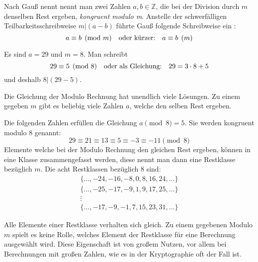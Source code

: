 \newpage
\noindent
Nach Gauß nennt nennt man zwei Zahlen $a, b \in \mathbb{Z}$, die bei der Division durch $m$
denselben Rest ergeben, \textit{kongruent modulo m}. Anstelle der schwerfälligen
Teilbarkeitsschreibweise $m|(a - b)$
führte Gauß folgende Schreibweise ein \parencite[180]{BOOK:numberTheory}:
\begin{equation}
  \label{eq:kongruenz}
  a \equiv b \pmod{m} \text{\quad oder kürzer:\quad} a \equiv b \pod{m}
\end{equation}

\begin{example}
  Es sind $a = 29$ und $m = 8$. Man schreibt
  \begin{equation*}
    29 \equiv 5 \pmod{8} \text{\quad oder als Gleichung:\quad} 29 = 3 \cdot 8 + 5
  \end{equation*}
  und deshalb $8|(29 - 5)$.
\end{example}

\noindent
Die Gleichung der Modulo Rechnung hat unendlich viele Lösungen. Zu einem gegeben $m$ gibt es
beliebig viele Zahlen $a$, welche den selben Rest ergeben.
\begin{example}
  Die folgenden Zahlen erfüllen die Gleichung $a \pmod{8} = 5$.
  Sie werden kongruent modulo 8 genannt:
  \begin{equation*}
    29 \equiv 21 \equiv 13 \equiv 5 \equiv -3 \equiv -11 \pmod{8}
  \end{equation*}
  Elemente welche bei der Modulo Rechnung den gleichen Rest ergeben,
  können in eine Klasse zusammengefasst werden, diese nennt man dann eine Restklasse bezüglich $m$.
  Die acht Restklassen bezüglich 8 sind:
  \begin{gather*}
    \{\dots,-24,-16,-8,0,8,16,24,\dots\} \\
    \{\dots,-25,-17,-9,1,9,17,25,\dots\} \\
    \vdots                               \\
    \{\dots,-17,-9,-1,7,15,23,31,\dots\}
  \end{gather*}
\end{example}

\noindent
Alle Elemente einer Restklasse verhalten sich gleich. Zu einem gegebenen Modulo $m$ spielt es
keine Rolle, welches Element der Restklasse für eine Berechnung ausgewählt wird.
Diese Eigenschaft ist von großem Nutzen, vor allem bei Berechnungen mit großen Zahlen,
wie es in der Kryptographie oft der Fall ist.

